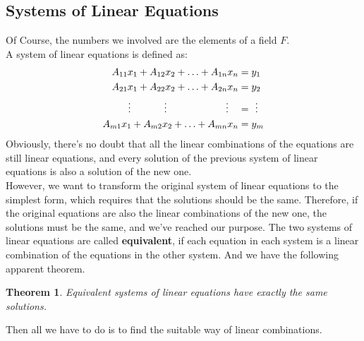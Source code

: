 \documentclass{article}
\begin{document}
\subsection{Systems of Linear Equations}\label{systems of le}
\noindent Of Course, the numbers we involved are the elements of a field $F$.\\
A system of linear equations is defined as:
\begin{align}
	A_{11}x_1+A_{12}x_2+\ldots+A_{1n}x_n&=y_1\notag\\
	A_{21}x_1+A_{22}x_2+\ldots+A_{2n}x_n&=y_2\notag\\
	\vdots\:\,\quad\quad\quad\vdots\quad\quad\quad\qquad\quad\vdots\quad&=\,\:\vdots\notag\\
	A_{m1}x_1+A_{m2}x_2+\ldots+A_{mn}x_n&=y_m\notag
\end{align}
\indent Obviously, there's no doubt that all the linear combinations of the equations are still linear equations, and every solution of the previous system of linear equations is also a solution of the new one.\\
\indent However, we want to transform the original system of linear equations to the simplest form, which requires that the solutions should be the same. Therefore, if the original equations are also the linear combinations of the new one, the solutions must be the same, and we've reached our purpose. The two systems of linear equations are called \textbf{equivalent}, if each equation in each system is a linear combination of the equations in the other system. And we have the following apparent theorem.\\
\theoremstyle{plain}\newtheorem{thm}{Theorem}[section]
\begin{thm}
	Equivalent systems of linear equations have exactly the same solutions.
\end{thm}
Then all we have to do is to find the suitable way of linear combinations.
\end{document}
